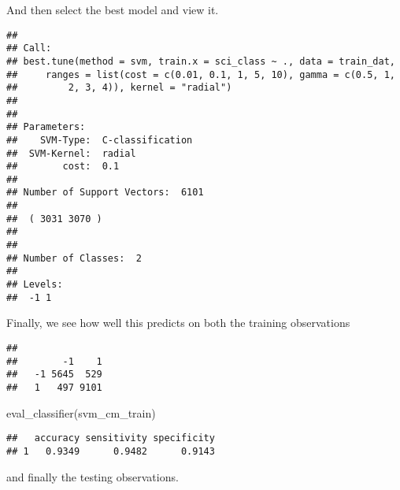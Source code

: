 \documentclass[
]{book}
\newenvironment{Shaded}{\begin{snugshade}}{\end{snugshade}}
\newcommand{\AttributeTok}[1]{\textcolor[rgb]{0.77,0.63,0.00}{#1}}
\newcommand{\FunctionTok}[1]{\textcolor[rgb]{0.00,0.00,0.00}{#1}}
\newcommand{\NormalTok}[1]{#1}
\newcommand{\OtherTok}[1]{\textcolor[rgb]{0.56,0.35,0.01}{#1}}
\newcommand{\SpecialCharTok}[1]{\textcolor[rgb]{0.00,0.00,0.00}{#1}}
\begin{document}
And then select the best model and view it.

\begin{Shaded}
\end{Shaded}

\begin{verbatim}
## 
## Call:
## best.tune(method = svm, train.x = sci_class ~ ., data = train_dat, 
##     ranges = list(cost = c(0.01, 0.1, 1, 5, 10), gamma = c(0.5, 1, 
##         2, 3, 4)), kernel = "radial")
## 
## 
## Parameters:
##    SVM-Type:  C-classification 
##  SVM-Kernel:  radial 
##        cost:  0.1 
## 
## Number of Support Vectors:  6101
## 
##  ( 3031 3070 )
## 
## 
## Number of Classes:  2 
## 
## Levels: 
##  -1 1
\end{verbatim}

Finally, we see how well this predicts on both the training observations

\begin{Shaded}
\end{Shaded}

\begin{verbatim}
##     
##        -1    1
##   -1 5645  529
##   1   497 9101
\end{verbatim}

\begin{Shaded}
\begin{Highlighting}[]
\FunctionTok{eval\_classifier}\NormalTok{(svm\_cm\_train)}
\end{Highlighting}
\end{Shaded}

\begin{verbatim}
##   accuracy sensitivity specificity
## 1   0.9349      0.9482      0.9143
\end{verbatim}

and finally the testing observations.

\begin{Shaded}
\end{Shaded}
\end{document}
